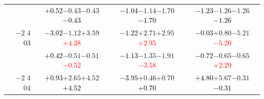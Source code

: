 \documentclass[compress]{beamer}
\begin{document}
\begin{frame}
\begin{tabular}{r | c | c | c}
          & \textcolor{black}{$+0.52$}\hspace{0.1 cm}$-0.43$\hspace{0.1 cm}$-0.43$\hspace{0.1 cm}\textcolor{black}{$-0.43$} & \textcolor{black}{$-1.04$}\hspace{0.1 cm}$-1.14$\hspace{0.1 cm}$-1.70$\hspace{0.1 cm}\textcolor{black}{$-1.70$} & \textcolor{black}{$-1.23$}\hspace{0.1 cm}$-1.26$\hspace{0.1 cm}$-1.26$\hspace{0.1 cm}\textcolor{black}{$-1.26$} \\
$-$2 4 03 & \textcolor{black}{$-3.02$}\hspace{0.1 cm}$-1.12$\hspace{0.1 cm}$+3.59$\hspace{0.1 cm}\textcolor{red}{$+4.38$} & \textcolor{black}{$-1.22$}\hspace{0.1 cm}$+2.71$\hspace{0.1 cm}$+2.95$\hspace{0.1 cm}\textcolor{red}{$+2.95$} & \textcolor{black}{$-0.03$}\hspace{0.1 cm}$+0.80$\hspace{0.1 cm}$-5.21$\hspace{0.1 cm}\textcolor{red}{$-5.20$} \\
          & \textcolor{black}{$+0.42$}\hspace{0.1 cm}$-0.51$\hspace{0.1 cm}$-0.51$\hspace{0.1 cm}\textcolor{red}{$-0.52$} & \textcolor{black}{$-1.13$}\hspace{0.1 cm}$-1.35$\hspace{0.1 cm}$-1.91$\hspace{0.1 cm}\textcolor{red}{$-3.58$} & \textcolor{black}{$-0.72$}\hspace{0.1 cm}$-0.65$\hspace{0.1 cm}$-0.65$\hspace{0.1 cm}\textcolor{red}{$+2.29$} \\
$-$2 4 04 & \textcolor{black}{$+0.93$}\hspace{0.1 cm}$+2.65$\hspace{0.1 cm}$+4.52$\hspace{0.1 cm}\textcolor{black}{$+4.52$} & \textcolor{black}{$-3.95$}\hspace{0.1 cm}$+0.46$\hspace{0.1 cm}$+0.70$\hspace{0.1 cm}\textcolor{black}{$+0.70$} & \textcolor{black}{$+4.80$}\hspace{0.1 cm}$+5.67$\hspace{0.1 cm}$-0.31$\hspace{0.1 cm}\textcolor{black}{$-0.31$} \\

\end{tabular}
\end{frame}
\end{document}
